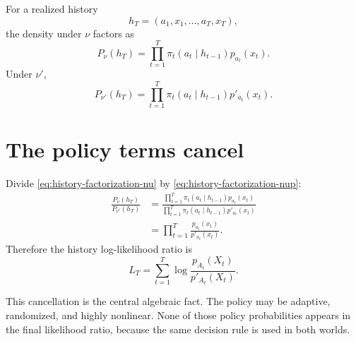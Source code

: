 \documentclass[en,nofont,11pt]{elegantbook}
\begin{document}
For a realized history
\[
h_T=(a_1,x_1,\ldots,a_T,x_T),
\]
the density under $\nu$ factors as
\begin{equation}
P_\nu(h_T)
=
\prod_{t=1}^{T}
\pi_t(a_t\mid h_{t-1})p_{a_t}(x_t).
\label{eq:history-factorization-nu}
\end{equation}
Under $\nu'$,
\begin{equation}
P_{\nu'}(h_T)
=
\prod_{t=1}^{T}
\pi_t(a_t\mid h_{t-1})p'_{a_t}(x_t).
\label{eq:history-factorization-nup}
\end{equation}

\section{The policy terms cancel}

Divide \eqref{eq:history-factorization-nu} by \eqref{eq:history-factorization-nup}:
\begin{align*}
\frac{P_\nu(h_T)}{P_{\nu'}(h_T)}
&=
\frac{\prod_{t=1}^{T}\pi_t(a_t\mid h_{t-1})p_{a_t}(x_t)}
{\prod_{t=1}^{T}\pi_t(a_t\mid h_{t-1})p'_{a_t}(x_t)}\\
&=
\prod_{t=1}^{T}\frac{p_{a_t}(x_t)}{p'_{a_t}(x_t)}.
\end{align*}
Therefore the history log-likelihood ratio is
\begin{equation}
L_T
=
\sum_{t=1}^{T}
\log\frac{p_{A_t}(X_t)}{p'_{A_t}(X_t)}.
\label{eq:bandit-llr}
\end{equation}

This cancellation is the central algebraic fact. The policy may be adaptive, randomized, and highly nonlinear. None of those policy probabilities appears in the final likelihood ratio, because the same decision rule is used in both worlds.
\end{document}
